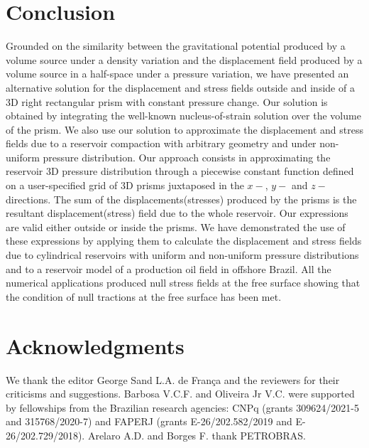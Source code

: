 \documentclass[P]{BrJG_submit}
\begin{document}
\section*{Conclusion}
Grounded on the similarity between the gravitational potential produced by a volume source under a density variation and the displacement field produced by a volume source in a half-space under a pressure variation, we have presented an alternative solution for the displacement and stress fields outside and inside of a 3D right rectangular prism with constant pressure change. 
Our solution is obtained by integrating the well-known nucleus-of-strain solution over the volume of the prism. 
We also use our solution to approximate the displacement and stress fields due to a reservoir compaction with arbitrary geometry and under non-uniform  pressure distribution.
Our approach consists in approximating the reservoir 3D pressure distribution through a piecewise constant function defined on a user-specified grid of 3D prisms juxtaposed in the $x-$, $y-$ and $z-$directions.
The sum of the displacements(stresses) produced by the prisms is the resultant displacement(stress) field due to the whole reservoir.
Our expressions are valid either outside or inside the prisms.
We have demonstrated the use of these expressions by applying them to calculate the displacement and stress fields due to cylindrical reservoirs with uniform and non-uniform pressure distributions and to a reservoir model of a production oil field in offshore Brazil.
All the numerical applications produced null stress fields  at the free surface showing that the condition of null tractions at the free surface has been met. 

\section*{Acknowledgments}
We thank the editor George Sand L.A. de Fran\c{c}a and the reviewers for their criticisms and suggestions.
Barbosa V.C.F. and Oliveira Jr V.C.  were supported by fellowships from  the Brazilian research agencies: CNPq (grants 309624/2021-5 and 315768/2020-7) and FAPERJ (grants E-26/202.582/2019 and E-26/202.729/2018). 
Arelaro A.D. and Borges F. thank PETROBRAS.
\end{document}
